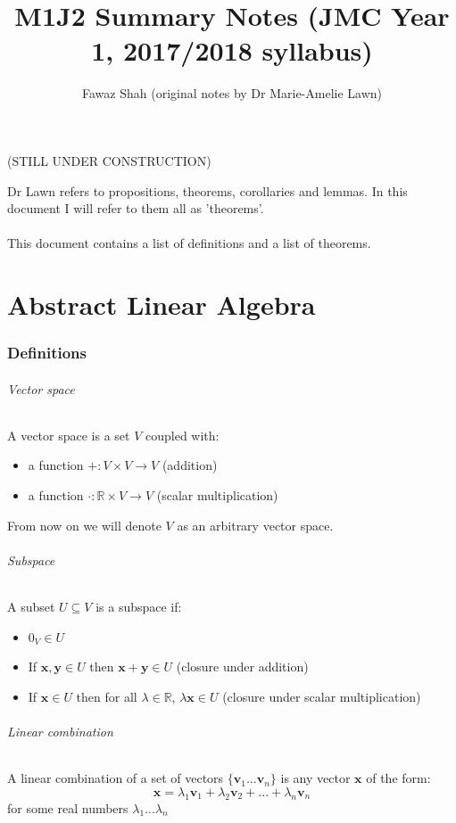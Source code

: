 \documentclass{article}
\title{M1J2 Summary Notes (JMC Year 1, 2017/2018 syllabus)}
\date{}
\author{Fawaz Shah (original notes by Dr Marie-Amelie Lawn)}
\newcommand{\R}{\mathbb{R}}
\renewcommand{\vec}[1]{\mathbf{#1}}
\begin{document}
\large
\maketitle
\begin{center}
(STILL UNDER CONSTRUCTION)
\end{center}
\noindent Dr Lawn refers to propositions, theorems, corollaries and lemmas. In this document I will refer to them all as 'theorems'.
\\\\
\noindent This document contains a list of definitions and a list of theorems.
\tableofcontents
\newpage
\part{Abstract Linear Algebra}

\section{Definitions}
\paragraph{Vector space}
A vector space is a set $ V $ coupled with:
\begin{itemize}
\item a function $ + : V \times V \to V $ (addition)
\item a function $ \cdot : \R \times V \to V $ (scalar multiplication)
\end{itemize}
From now on we will denote $ V $ as an arbitrary vector space.
\paragraph{Subspace}
A subset $ U \subseteq V $ is a subspace if:
\begin{itemize}
\item $ 0_{V} \in U $
\item If $ \vec{x}, \vec{y} \in U $ then $ \vec{x + y} \in U $ (closure under addition)
\item If $ \vec{x} \in U $ then for all $ \lambda \in \R $, $ \lambda\vec{x} \in U $ (closure under scalar multiplication)
\end{itemize}
\paragraph{Linear combination}
A linear combination of a set of vectors $ \{\vec{v}_{1}...\vec{v}_{n}\} $ is any vector $ \vec{x} $ of the form:
\begin{equation}
\vec{x} = \lambda_{1}\vec{v}_{1} + \lambda_{2}\vec{v}_{2} + ... + \lambda_{n}\vec{v}_{n}
\end{equation}
for some real numbers $ \lambda_{1}...\lambda_{n} $
\end{document}
